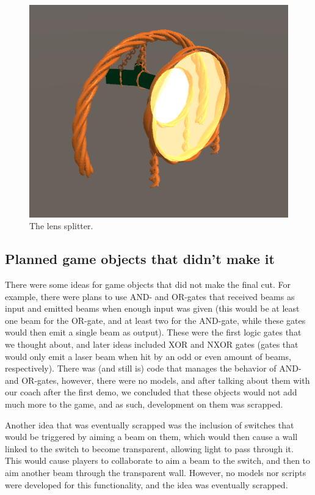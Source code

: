 			\begin{figure}[!ht]
				\centering
				\includegraphics[scale = 0.3]{LensSplitter}
				\caption{The lens splitter.}
				\label{fig:lenssplitter}
			\end{figure}
			
		\subsection{Planned game objects that didn't make it} \label{ssec:planned}
			There were some ideas for game objects that did not make the
			final cut. For example, there were plans to use AND- and OR-gates
			that received beams as input and emitted beams when enough input
			was given (this would be at least one beam for the OR-gate, and
			at least two for the AND-gate, while these gates would then emit
			a single beam as output). These were the first logic gates that
			we thought about, and later ideas included XOR and NXOR gates
			(gates that would only emit a laser beam when hit by an odd or 
			even amount of beams, respectively). There was (and still is) 
			code that manages the behavior of AND- and OR-gates, however, 
			there were no models, and after talking
			about them with our coach after the first demo, we concluded that
			these objects would not add much more to the game, and as such,
			development on them was scrapped.
			
			Another idea that was eventually scrapped was the inclusion of
			switches that would be triggered by aiming a beam on them, which
			would then cause a wall linked to the switch to become transparent,
			allowing light to pass through it. This would cause players to
			collaborate to aim a beam to the switch, and then to aim another
			beam through the transparent wall. However, no models nor scripts
			were developed for this functionality, and the idea was eventually
			scrapped.
			
